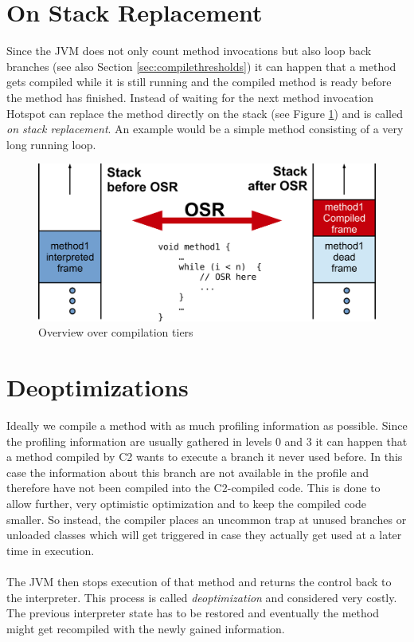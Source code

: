 \section{On Stack Replacement}
\label{sec:onstackreplacement}
Since the JVM does not only count method invocations but also loop back branches (see also Section \ref{sec:compilethresholds}) it can happen that a method gets compiled while it is still running and the compiled method is ready before the method has finished.
Instead of waiting for the next method invocation Hotspot can replace the method directly on the stack (see Figure \ref{fig:osr}) and is called \textit{on stack replacement}.
An example would be a simple method consisting of a very long running loop.
\begin{figure}[h]
  \begin{center}
    \centering
    \includegraphics{figures/osr.png}
    \caption{Overview over compilation tiers}
    \label{fig:osr}
  \end{center}
\end{figure}

\section{Deoptimizations}
\label{sec:deoptimizations}
Ideally we compile a method with as much profiling information as possible.
Since the profiling information are usually gathered in levels 0 and 3 it can happen that a method compiled by C2 wants to execute a branch it never used before.
In this case the information about this branch are not available in the profile and therefore have not been compiled into the C2-compiled code.
This is done to allow further, very optimistic optimization and to keep the compiled code smaller. So instead, the compiler places an uncommon trap at unused branches or unloaded classes which will get triggered in case they actually get used at a later time in execution.
\\\\
The JVM then stops execution of that method and returns the control back to the interpreter. This process is called \textit{deoptimization} and considered very costly. The previous interpreter state has to be restored and eventually the method might get recompiled with the newly gained information.

